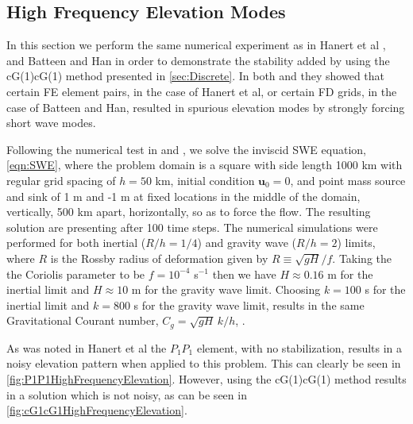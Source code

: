 \subsection{High Frequency Elevation Modes} \label{sse:ElevModes}
  In this section we perform the same numerical experiment as in Hanert et al
  \cite{Hanert2002}, and Batteen and Han \cite{Batteen1981} in order to
  demonstrate the stability added by using the cG(1)cG(1) method presented in
  \autoref{sec:Discrete}. In both \cite{Hanert2002} and \cite{Batteen1981} they
  showed that certain FE element pairs, in the case of Hanert et al, or certain FD
  grids, in the case of Batteen and Han, resulted in spurious elevation modes by
  strongly forcing short wave modes.

  Following the numerical test in \cite{Hanert2002} and \cite{Batteen1981}, we
  solve the inviscid SWE equation, \eqref{eqn:SWE}, where the problem domain is
  a square with side length 1000 km with regular grid spacing of $h=50$ km,
  initial condition $\mathbf{u}_0 = 0$, and point mass source and sink of 1 m
  and -1 m at fixed locations in the middle of the domain, vertically, 500 km
  apart, horizontally, so as to force the flow.  The resulting solution are
  presenting after 100 time steps. The numerical simulations were performed for
  both inertial ($R/h = 1/4$) and gravity wave ($R/h = 2$) limits, where $R$ is
  the Rossby radius of deformation given by $R \equiv \sqrt{gH}/f$. Taking the
  the Coriolis parameter to be $f = 10^{-4}$ s$^{-1}$ then we have $H \approx
  0.16$ m for the inertial limit and $H \approx 10$ m for the gravity wave
  limit. Choosing $k = 100$ s for the inertial limit and $k = 800$ s for the gravity
  wave limit, results in the same Gravitational Courant number, $C_g =
  \sqrt{gH}\,k/h$, \cite{Le-Roux1998}.

  As was noted in Hanert et al \cite{Hanert2002} the $P_1P_1$ element, with no
  stabilization, results in a noisy elevation pattern when applied to this
  problem. This can clearly be seen in \autoref{fig:P1P1HighFrequencyElevation}.
  However, using the cG(1)cG(1) method results in a solution which is not noisy,
  as can be seen in \autoref{fig:cG1cG1HighFrequencyElevation}.
